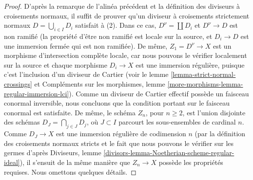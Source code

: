 \begin{proof}
\medskip\noindent
D'après la remarque de l'alinéa précédent et la définition
des diviseurs à croisements normaux, il suffit de prouver qu'un
diviseur à croisements strictement normaux $D = \bigcup_{i \in I} D_i$
satisfait à (2). Dans ce cas, $D^\nu = \coprod D_i$
et $D^\nu \to D$ est non ramifié (la propriété d'être non ramifié
est locale sur la source, et $D_i \to D$ est une immersion
fermée qui est non ramifiée). De même, $Z_1 = D^\nu \to X$
est un morphisme d'intersection complète locale, car nous pouvons
le vérifier localement sur la source et chaque morphisme $D_i \to X$
est une immersion régulière, puisque c'est l'inclusion d'un diviseur de Cartier
(voir le lemme \ref{lemma-strict-normal-crossings} et
Compléments sur les morphismes, lemme \ref{more-morphisms-lemma-regular-immersion-lci}).
Comme un diviseur de Cartier effectif possède un faisceau
conormal inversible, nous concluons que la condition portant sur le
faisceau conormal est satisfaite.
De même, le schéma $Z_n$, pour $n \geq 2$, est l'union disjointe
des schémas $D_J = \bigcap_{j \in J} D_j$, où $J \subset I$
parcourt les sous-ensembles de cardinal $n$. Comme $D_J \to X$ est
une immersion régulière de codimension $n$
(par la définition des croisements normaux stricts et le
fait que nous pouvons le vérifier sur les germes d'après
Diviseurs, lemme \ref{divisors-lemma-Noetherian-scheme-regular-ideal}),
il s'ensuit de la même manière que $Z_n \to X$ possède les propriétés
requises. Nous omettons quelques détails.


\end{proof}
